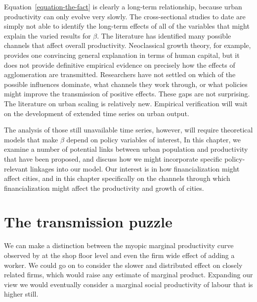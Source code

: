 Equation~\ref{equation-the-fact} is clearly a long-term relationship, because urban productivity can only evolve very slowly. The cross-sectional studies to date are simply not able to identify the long-term effects of all of the variables that might explain the varied results for  $\beta$. The literature has identified many possible channels that affect overall productivity. Neoclassical growth theory, for example, provides one convincing general explanation in terms of human capital, but it does not provide definitive empirical evidence on precisely how the effects of agglomeration are transmitted. Researchers have not settled on which  of the possible influences dominate, what channels they work through, or what policies might improve the transmission of positive effects. These gaps are  not surprising. The literature on urban scaling is relatively new.  Empirical verification will wait on the development of extended time series on urban output.



The analysis of those still unavailable time series, however, will require theoretical models that make $\beta$ depend on policy variables of interest,  In this chapter, we examine a number of potential  links between urban population and productivity that have been proposed, and discuss how we  might incorporate specific policy-relevant linkages into our model.  Our interest is in how financialization might affect cities, and in this chapter specifically on the channels through which financialization might affect the productivity and growth of cities.



\section{The transmission puzzle}
We can make a distinction between the myopic marginal productivity curve observed by at the shop floor level and even the firm wide effect of adding a worker. We could go on to consider the slower and distributed effect on closely related firms, which would raise any estimate of marginal product. Expanding our view we  would eventually consider a marginal social productivity of labour that is higher still. 

